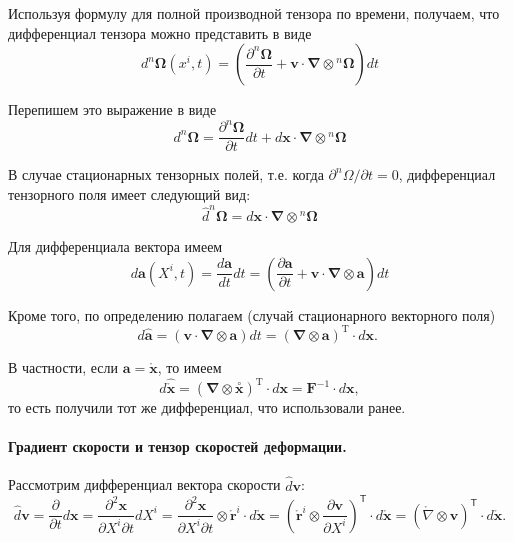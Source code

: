 \begin{definition*}
Используя формулу для полной производной тензора по времени, получаем, что дифференциал тензора можно представить в виде
\begin{equation*}
d^{n} \boldsymbol{\Omega}\left(x^{i}, t\right)=\left(\frac{\partial^{n} \boldsymbol{\Omega}}{\partial t}+\mathbf{v} \cdot \boldsymbol{\nabla} \otimes{ }^{n} \boldsymbol{\Omega}\right) d t 
\end{equation*}

Перепишем это выражение в виде
\begin{equation*}
d^{n} \boldsymbol{\Omega}=\frac{\partial^{n} \boldsymbol{\Omega}}{\partial t} d t+d \mathbf{x} \cdot \boldsymbol{\nabla} \otimes{ }^{n} \boldsymbol{\Omega}
\end{equation*}

В случае стационарных тензорных полей, т.е. когда $\partial^{n} \Omega / \partial t=0$, дифференциал тензорного поля имеет следующий вид:
\begin{equation*}
\widehat{d}^{n} \boldsymbol{\Omega}=d \mathbf{x} \cdot \boldsymbol{\nabla} \otimes{ }^{n} \boldsymbol{\Omega}
\end{equation*}

Для дифференциала вектора имеем 
\begin{equation*}
d \mathbf{a}\left(X^{i}, t\right)=\frac{d \mathbf{a}}{d t} d t=\left(\frac{\partial \mathbf{a}}{\partial t}+\mathbf{v} \cdot \boldsymbol{\nabla} \otimes \mathbf{a}\right) d t
\end{equation*}

Кроме того, по определению полагаем (случай стационарного векторного поля)
\begin{equation*}
d \hat{\mathbf{a}}=(\mathbf{v} \cdot \boldsymbol{\nabla} \otimes \mathbf{a}) d t=(\boldsymbol{\nabla} \otimes \mathbf{a})^{\mathrm{T}} \cdot d \mathbf{x} \text {. }
\end{equation*}


В частности, если $\mathbf{a}=\mathring{\mathbf{x}}$, то имеем
\begin{equation*}
d \widehat{\mathring{\mathbf{x}}}=(\boldsymbol{\nabla} \otimes
\stackrel{\circ}{\mathbf{x}})^{\mathrm{T}} \cdot d \mathbf{x}=\mathbf{F}^{-1}
\cdot d \mathbf{x},
\end{equation*}
то есть получили тот же дифференциал, что использовали ранее.

\paragraph{Градиент скорости и тензор скоростей деформации.} Рассмотрим дифференциал вектора скорости $\widehat{d}
\mathbf{v}$: 
\[
  \hat{d}\mathbf{v} = \frac{\partial}{\partial t} d\mathbf{x} = \frac{\partial^2
  \mathbf{x}}{\partial X^i \partial t} dX^i = \frac{\partial^2
\mathbf{x}}{\partial X^i \partial t}\otimes \mathring{\mathbf{r}}^i\cdot
d\mathring{\mathbf{x}} = \left( \mathring{\mathbf{r}}^i\otimes \frac{\partial
\mathbf{v}}{\partial X^i} \right)^{\mathsf T} \cdot d\mathring{\mathbf{x}} =
(\mathring{\nabla}\otimes\mathbf{v})^{\mathsf T} \cdot d\mathring{\mathbf{x}}.
\]


\end{definition*}
